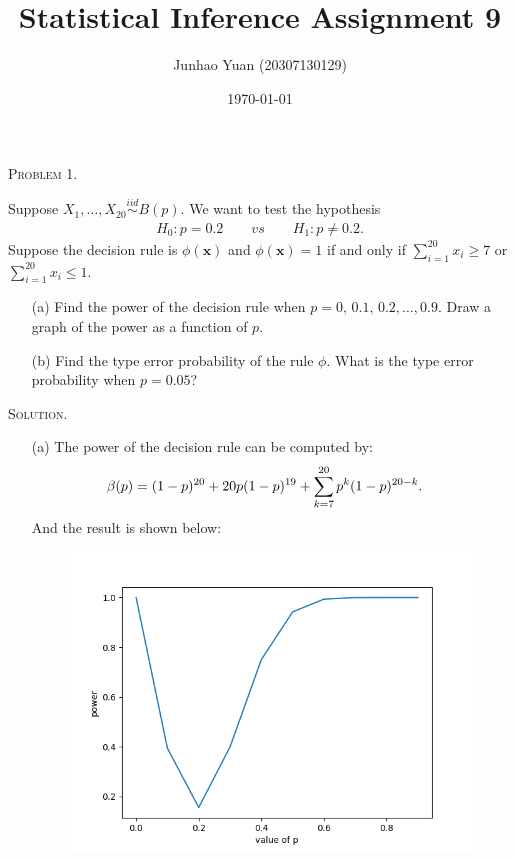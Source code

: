 \documentclass{article}
\title{\textbf{Statistical Inference Assignment 9}}
\author{Junhao Yuan (20307130129)}
\date{\today}
\newcommand{\RNum}[1]{\uppercase\expandafter{\romannumeral #1\relax}}  %
\begin{document}
\begin{CJK}{UTF8}{gbsn}

    \maketitle
    \def \RR{{\mathbb R}}
    \def \EE{{\mathbb E}}
    \def \VV{{\mathbb V}}
    \def \II{{\mathbb I}}
    \def \NN{{\mathcal N}}


    \begin{shaded}
        \noindent\textsc{Problem 1.}\par
        Suppose $X_1, \ldots, X_{20}\mathop{\sim}\limits^{iid}B(p)$. We want to test the hypothesis
        \begin{align}
            H_0: p=0.2\qquad vs\qquad  H_1: p \neq 0.2.\label{power-1}
        \end{align}
        Suppose the decision rule is $\phi(\bm{x})$ and $\phi(\bm{x})=1$ if and only if $\sum_{i=1}^{20} x_i \geq 7$ or
        $\sum_{i=1}^{20} x_i \leq 1$.
        \begin{itemize}
            \item [(a)] Find the power of the decision rule when $p=0,\, 0.1,\, 0.2, \ldots, 0.9$. Draw
                  a graph of the power as a function of $p$.
            \item [(b)] Find the type \RNum{1} error probability of the rule $\phi$. What is the type \RNum{2} error
                  probability when $p=0.05$?
        \end{itemize}
    \end{shaded}
    \noindent\textsc{Solution.}\par
    \begin{itemize}
        \item [(a)]
              The power of the decision rule can be computed by:
              \begin{align}
                  \beta(p) & = (1-p)^{20} + 20 p(1-p)^{19} + \sum_{k=7}^{20} p^k (1-p)^{20-k}.\notag
              \end{align}
              And the result is shown below:
              \begin{figure}[htbp]
                  \centering
                  \includegraphics[scale=0.4]{power.png}

\end{figure}
\end{itemize}
\end{CJK}
\end{document}
